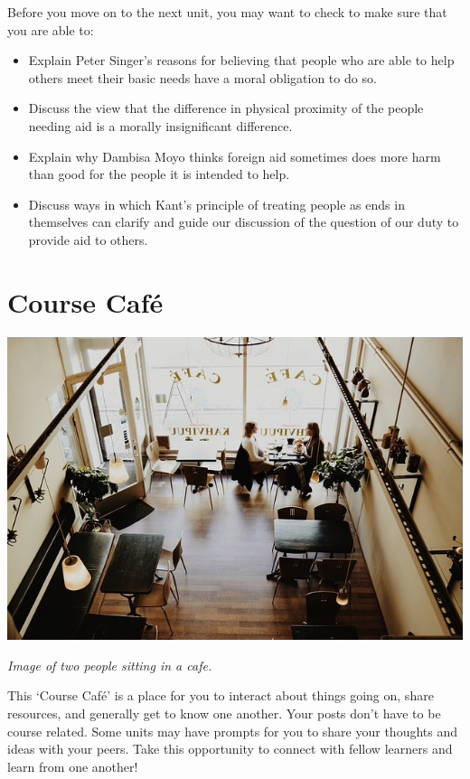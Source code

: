 \documentclass[
]{book}
\providecommand{\tightlist}{%
  \setlength{\itemsep}{0pt}\setlength{\parskip}{0pt}}
\begin{document}
\begin{progress}
Before you move on to the next unit, you may want to check to make sure that you are able to:

\begin{itemize}
\tightlist
\item
  Explain Peter Singer's reasons for believing that people who are able to help others meet their basic needs have a moral obligation to do so.\\
\item
  Discuss the view that the difference in physical proximity of the people needing aid is a morally insignificant difference.\\
\item
  Explain why Dambisa Moyo thinks foreign aid sometimes does more harm than good for the people it is intended to help.\\
\item
  Discuss ways in which Kant's principle of treating people as ends in themselves can clarify and guide our discussion of the question of our duty to provide aid to others.
\end{itemize}
\end{progress}

\hypertarget{course-cafuxe9}{%
\chapter{Course Café}\label{course-cafuxe9}}

\includegraphics{assets/course-cafe/course-cafe.jpg}

\emph{Image of two people sitting in a cafe.}

This `Course Café' is a place for you to interact about things going on, share
resources, and generally get to know one another. Your posts don't have to be
course related. Some units may have prompts for you to share your thoughts and
ideas with your peers. Take this opportunity to connect with fellow learners and
learn from one another!
\end{document}
